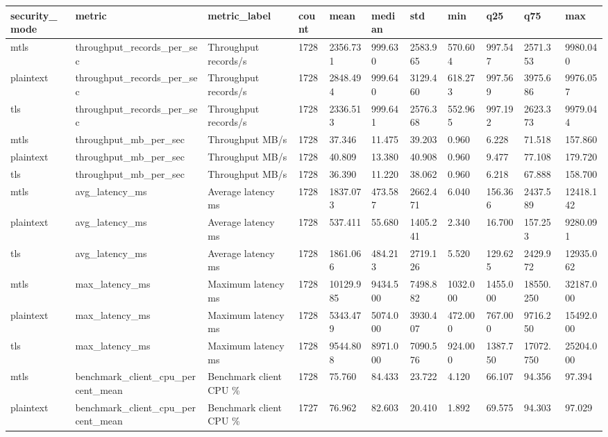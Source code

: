 \begin{tabular}{lllllllllll}
\hline
security\_mode & metric & metric\_label & count & mean & median & std & min & q25 & q75 & max \\
\hline
mtls & throughput\_records\_per\_sec & Throughput records/s & 1728 & 2356.731 & 999.630 & 2583.965 & 570.604 & 997.547 & 2571.353 & 9980.040 \\
plaintext & throughput\_records\_per\_sec & Throughput records/s & 1728 & 2848.494 & 999.640 & 3129.460 & 618.273 & 997.569 & 3975.686 & 9976.057 \\
tls & throughput\_records\_per\_sec & Throughput records/s & 1728 & 2336.513 & 999.641 & 2576.368 & 552.965 & 997.192 & 2623.373 & 9979.044 \\
mtls & throughput\_mb\_per\_sec & Throughput MB/s & 1728 & 37.346 & 11.475 & 39.203 & 0.960 & 6.228 & 71.518 & 157.860 \\
plaintext & throughput\_mb\_per\_sec & Throughput MB/s & 1728 & 40.809 & 13.380 & 40.908 & 0.960 & 9.477 & 77.108 & 179.720 \\
tls & throughput\_mb\_per\_sec & Throughput MB/s & 1728 & 36.390 & 11.220 & 38.062 & 0.960 & 6.218 & 67.888 & 158.700 \\
mtls & avg\_latency\_ms & Average latency ms & 1728 & 1837.073 & 473.587 & 2662.471 & 6.040 & 156.366 & 2437.589 & 12418.142 \\
plaintext & avg\_latency\_ms & Average latency ms & 1728 & 537.411 & 55.680 & 1405.241 & 2.340 & 16.700 & 157.253 & 9280.091 \\
tls & avg\_latency\_ms & Average latency ms & 1728 & 1861.066 & 484.213 & 2719.126 & 5.520 & 129.625 & 2429.972 & 12935.062 \\
mtls & max\_latency\_ms & Maximum latency ms & 1728 & 10129.985 & 9434.500 & 7498.882 & 1032.000 & 1455.000 & 18550.250 & 32187.000 \\
plaintext & max\_latency\_ms & Maximum latency ms & 1728 & 5343.479 & 5074.000 & 3930.407 & 472.000 & 767.000 & 9716.250 & 15492.000 \\
tls & max\_latency\_ms & Maximum latency ms & 1728 & 9544.808 & 8971.000 & 7090.576 & 924.000 & 1387.750 & 17072.750 & 25204.000 \\
mtls & benchmark\_client\_cpu\_percent\_mean & Benchmark client CPU \% & 1728 & 75.760 & 84.433 & 23.722 & 4.120 & 66.107 & 94.356 & 97.394 \\
plaintext & benchmark\_client\_cpu\_percent\_mean & Benchmark client CPU \% & 1727 & 76.962 & 82.603 & 20.410 & 1.892 & 69.575 & 94.303 & 97.029 \\

\end{tabular}
